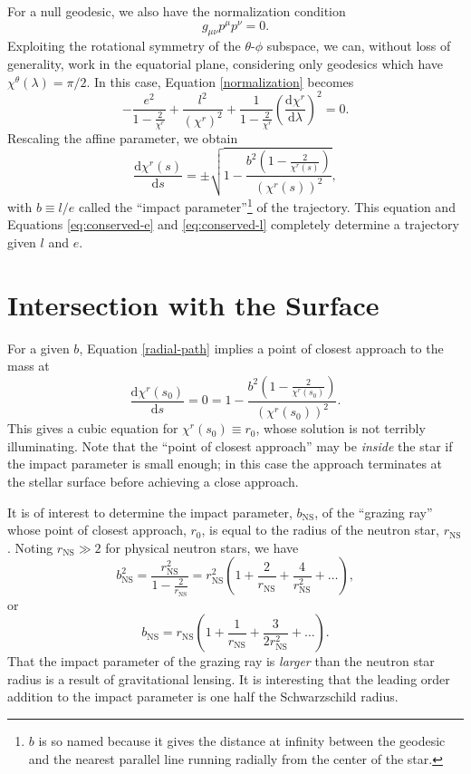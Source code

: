 \documentclass[modern]{aastex631}
\newcommand{\dd}{\mathrm{d}}
\newcommand{\bNS}{b_\mathrm{NS}}
\newcommand{\rNS}{r_\mathrm{NS}}
\begin{document}
For a null geodesic, we also have the normalization condition 
\begin{equation}
\label{normalization}
g_{\mu \nu} p^\mu p^\nu = 0.
\end{equation}
Exploiting the rotational symmetry of the $\theta$-$\phi$ subspace, we can,
without loss of generality, work in the equatorial plane, considering only
geodesics which have $\chi^\theta (\lambda) = \pi /2$.  In this case, Equation
\ref{normalization} becomes
\begin{equation}
-\frac{e^2}{1 - \frac{2}{\chi^r}} + \frac{l^2}{(\chi^r)^2} + \frac{1}{1-\frac{2}{\chi^r}} \left( \frac{\dd \chi^r}{\dd \lambda} \right)^2 = 0.
\end{equation}
Rescaling the affine parameter, we obtain
\begin{equation}
\label{radial-path}
\frac{\dd \chi^r(s)}{\dd s} = \pm \sqrt{1 - \frac{b^2\left(1 - \frac{2}{\chi^r(s)} \right)}{(\chi^r(s))^2}},
\end{equation}
with $b \equiv l/e$ called the ``impact parameter''\footnote{$b$ is so named
because it gives the distance at infinity between the geodesic and the nearest
parallel line running radially from the center of the star.} of the trajectory.
This equation and Equations \ref{eq:conserved-e} and \ref{eq:conserved-l}
completely determine a trajectory given $l$ and $e$.  

\section{Intersection with the Surface}
\label{sec:surface}

For a given $b$, Equation \ref{radial-path} implies a point of closest approach
to the mass at 
\begin{equation}
\frac{\dd \chi^r(s_0)}{\dd s} = 0 = 1 - \frac{b^2 \left( 1 - \frac{2}{\chi^r\left(s_0\right)} \right)}{(\chi^r(s_0))^2}.
\end{equation}
This gives a cubic equation for $\chi^r(s_0)\equiv r_0$, whose solution is not
terribly illuminating.  Note that the ``point of closest approach'' may be
\emph{inside} the star if the impact parameter is small enough; in this case the
approach terminates at the stellar surface before achieving a close approach.

It is of interest to determine the impact parameter, $\bNS$, of the ``grazing
ray'' whose point of closest approach, $r_0$, is equal to the radius of the
neutron star, $\rNS$.  Noting $\rNS \gg 2$ for physical neutron stars, we have 
\begin{equation}
     \bNS^2 = \frac{\rNS^2}{1 - \frac{2}{\rNS}} = \rNS^2 \left( 1 + \frac{2}{\rNS} + \frac{4}{\rNS^2} + \ldots \right),
\end{equation}
or 
\begin{equation}
    \bNS = \rNS \left( 1 + \frac{1}{\rNS} + \frac{3}{2 \rNS^2} + \ldots \right).
\end{equation}
That the impact parameter of the grazing ray is \emph{larger} than the neutron
star radius is a result of gravitational lensing.  It is interesting that the
leading order addition to the impact parameter is one half the Schwarzschild
radius.
\end{document}
